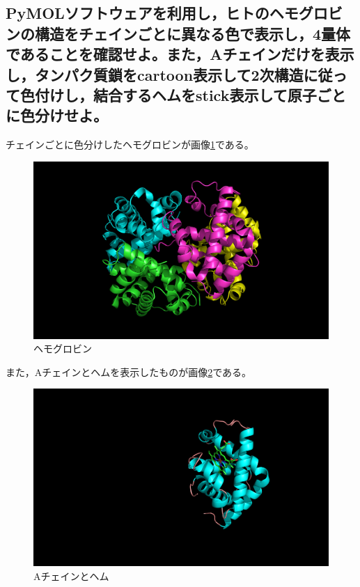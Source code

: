 \documentclass[uplatex,a4j]{jsarticle}
\begin{document}
  \subsection{PyMOLソフトウェアを利用し，ヒトのヘモグロビンの構造をチェインごとに異なる色で表示し，4量体であることを確認せよ。また，Aチェインだけを表示し，タンパク質鎖をcartoon表示して2次構造に従って色付けし，結合するヘムをstick表示して原子ごとに色分けせよ。}
  チェインごとに色分けしたヘモグロビンが画像\ref{2_6_1}である。
  \begin{figure}[H]
    \begin{center}
      \includegraphics[width=12cm]{1BUW.png}
      \caption{ヘモグロビン}
      \label{2_6_1}
    \end{center}
  \end{figure}
  また，Aチェインとヘムを表示したものが画像\ref{2_6_2}である。
  \begin{figure}[H]
    \begin{center}
      \includegraphics[width=12cm]{hem.png}
      \caption{Aチェインとヘム}
      \label{2_6_2}
    \end{center}
  \end{figure}
  
\end{document}

